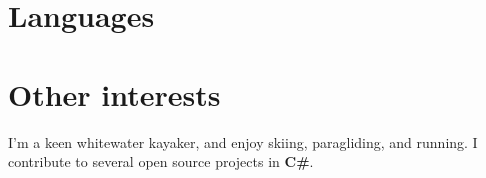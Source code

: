 \documentclass[11pt,a4paper,sans]{moderncv}        %
\begin{document}
\section{Languages}

\section{Other interests}
I'm a keen whitewater kayaker, and enjoy skiing, paragliding, and running. I contribute to several open source projects in \textbf{C\#}.

\clearpage
\end{document}
